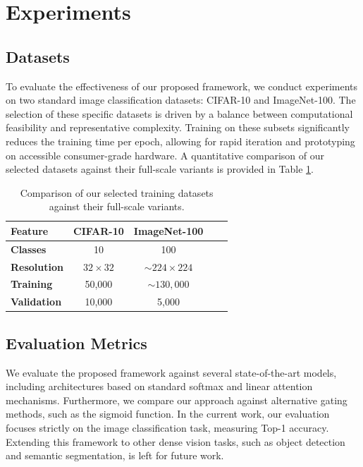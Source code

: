 \section{Experiments}


\subsection{Datasets}

To evaluate the effectiveness of our proposed framework, we conduct experiments on two standard image classification datasets: CIFAR-10 and ImageNet-100. The selection of these specific datasets is driven by a balance between computational feasibility and representative complexity. Training on these subsets significantly reduces the training time per epoch, allowing for rapid iteration and prototyping on accessible consumer-grade hardware. 
A quantitative comparison of our selected datasets against their full-scale variants is provided in Table \ref{tab:dataset_comparison}.

\begin{table}[htbp]
    \centering
    \caption{Comparison of our selected training datasets against their full-scale variants.}
    \label{tab:dataset_comparison}
    \begin{tabular}{lcccc}
        \toprule
        \textbf{Feature} & \textbf{CIFAR-10}  & \textbf{ImageNet-100}\\
        \midrule
        \textbf{Classes} & 10  & 100 \\
        \textbf{Resolution} & $32 \times 32$  & $\sim 224 \times 224$  \\
        \textbf{Training} & 50,000  & $\sim 130,000$  \\
        \textbf{Validation} & 10,000& 5,000 \\
        \bottomrule
    \end{tabular}
\end{table}

\subsection{Evaluation Metrics}
We evaluate the proposed framework against several state-of-the-art models, including architectures based on standard softmax and linear attention mechanisms. Furthermore, we compare our approach against alternative gating methods, such as the sigmoid function. In the current work, our evaluation focuses strictly on the image classification task, measuring Top-1 accuracy. Extending this framework to other dense vision tasks, such as object detection and semantic segmentation, is left for future work.
